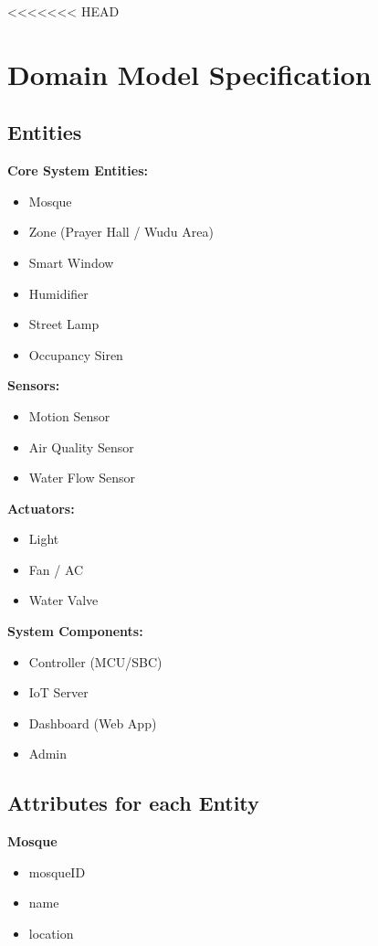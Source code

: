 <<<<<<< HEAD
\section{Domain Model Specification}

\subsection{Entities}
\textbf{Core System Entities:}
\begin{itemize}
  \item Mosque
  \item Zone (Prayer Hall / Wudu Area)
  \item Smart Window
  \item Humidifier
  \item Street Lamp
  \item Occupancy Siren
\end{itemize}

\textbf{Sensors:}
\begin{itemize}
  \item Motion Sensor
  \item Air Quality Sensor
  \item Water Flow Sensor
\end{itemize}

\textbf{Actuators:}
\begin{itemize}
  \item Light
  \item Fan / AC
  \item Water Valve
\end{itemize}

\textbf{System Components:}
\begin{itemize}
  \item Controller (MCU/SBC)
  \item IoT Server
  \item Dashboard (Web App)
  \item Admin
\end{itemize}

\subsection{Attributes for each Entity}
\textbf{Mosque}
\begin{itemize}
  \item mosqueID
  \item name
  \item location
\end{itemize}

